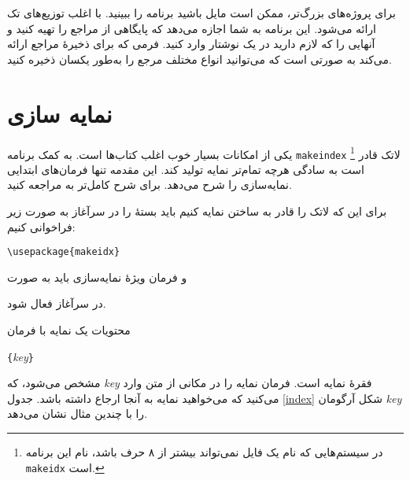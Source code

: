 برای پروژه‌های بزرگ‌تر، ممکن است مایل باشید برنامه  را ببینید.  با اغلب توزیع‌های تک ارائه می‌شود. این برنامه به شما اجازه می‌دهد که پایگاهی از مراجع را تهیه کنید و آنهایی را که لازم دارید در یک نوشتار‌ وارد کنید. فرمی که  برای ذخیرهٔ مراجع ارائه می‌کند به صورتی است که می‌توانید انواع مختلف مرجع را به‌طور یکسان ذخیره کنید.


\section{نمایه سازی}\label{sec:indexing}
یکی از امکانات بسیار خوب اغلب کتاب‌ها  
است. به کمک برنامه 
\texttt{makeindex} 
\footnote{در سیستم‌هایی که نام یک فایل نمی‌تواند بیشتر از ۸ حرف باشد، نام این برنامه \texttt{makeidx} است.} 
لاتک قادر است به سادگی هرچه تمام‌تر نمایه تولید کند. این مقدمه تنها فرمان‌های ابتدایی نمایه‌سازی را شرح می‌دهد. برای شرح کامل‌تر به  \companion مراجعه کنید.   

برای این که لاتک را قادر به ساختن نمایه کنیم باید بستهٔ 
 را در سرآغاز به صورت زیر فراخوانی کنیم:
\begin{lscommand}
\verb|\usepackage{makeidx}|
\end{lscommand}
\noindent و فرمان ویژهٔ نمایه‌سازی باید به صورت 
\begin{lscommand}
\end{lscommand}
\noindent در سرآغاز فعال شود.

محتویات یک نمایه با فرمان
\begin{lscommand}
  \verb|{|\emph{key}\verb|}|
\end{lscommand}
\noindent 
مشخص می‌شود، که 
\emph{key}
فقرهٔ نمایه است. فرمان نمایه را در مکانی از متن وارد می‌کنید که می‌خواهید نمایه به آنجا ارجاع داشته باشد. جدول 
\ref{index}
شکل آرگومان 
\emph{key} 
را با چندین مثال نشان می‌دهد.

